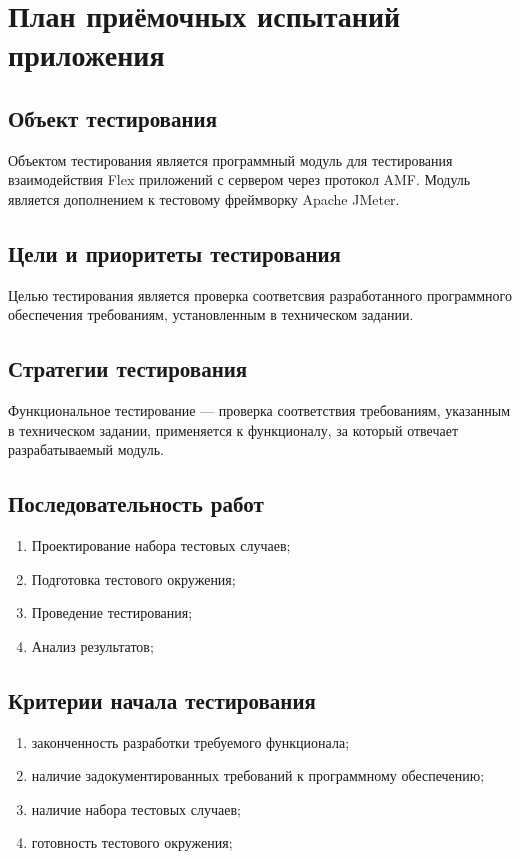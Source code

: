 \chapter{План приёмочных испытаний приложения}
\label{cha:appendix2}

\section{Объект тестирования}

Объектом тестирования является программный модуль для тестирования взаимодействия Flex приложений с сервером через
протокол AMF. Модуль является дополнением к тестовому фреймворку Apache JMeter.

\section{Цели и приоритеты тестирования}

Целью тестирования является проверка соответсвия разработанного программного обеспечения требованиям, установленным
в техническом задании.

\section{Стратегии тестирования}

Функциональное тестирование --- проверка соответствия требованиям, указанным в техническом задании,
применяется к функционалу, за который отвечает разрабатываемый модуль.

\section{Последовательность работ}

\begin{enumerate}
\item Проектирование набора тестовых случаев;
\item Подготовка тестового окружения;
\item Проведение тестирования;
\item Анализ результатов;
\end{enumerate}

\section{Критерии начала тестирования}

\begin{enumerate}
\item законченность разработки требуемого функционала;
\item наличие задокументированных требований к программному обеспечению;
\item наличие набора тестовых случаев;
\item готовность тестового окружения;
\end{enumerate}

